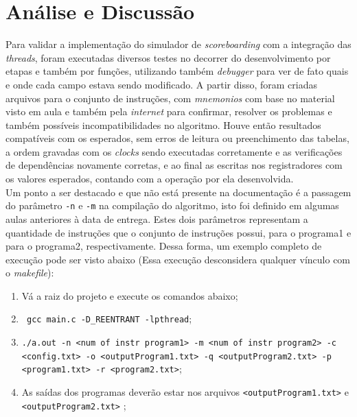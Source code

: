 \documentclass[journal]{IEEEtran}
\begin{document}
\section{Análise e Discussão}

Para validar a implementação do simulador de \textit{scoreboarding} com a integração das \textit{threads}, foram executadas diversos testes no decorrer do desenvolvimento por etapas e também por funções, utilizando também \textit{debugger} para ver de fato quais e onde cada campo estava sendo modificado. A partir disso, foram criadas arquivos para o conjunto de instruções, com \textit{mnemonios} com base no material visto em aula e também pela \textit{internet} para confirmar, resolver os problemas e também possíveis incompatibilidades no algoritmo. Houve então resultados compatíveis com os esperados, sem erros de leitura ou preenchimento das tabelas, a ordem gravadas com os \textit{clocks} sendo executadas corretamente e as verificações de dependências novamente corretas, e ao final as escritas nos registradores com os valores esperados, contando com a operação por ela desenvolvida.\\
Um ponto a ser destacado e que não está presente na documentação é a passagem do parâmetro \texttt{-n} e \texttt{-m} na compilação do algoritmo, isto foi definido em algumas aulas anteriores à data de entrega. Estes dois parâmetros representam a quantidade de instruções que o conjunto de instruções possui, para o programa1 e para o programa2, respectivamente. Dessa forma, um exemplo completo de execução pode ser visto abaixo (Essa execução desconsidera qualquer vínculo com o \textit{makefile}):
\begin{enumerate}
    \item Vá a raiz do projeto e execute os comandos abaixo;
    \item \texttt{ gcc main.c -D\_REENTRANT -lpthread};
    \item \texttt{./a.out -n <num of instr program1> -m <num of instr program2> -c <config.txt> -o <outputProgram1.txt> -q <outputProgram2.txt> -p <program1.txt> -r <program2.txt>};
    \item As saídas dos programas deverão estar nos arquivos \texttt{<outputProgram1.txt>} e \texttt{<outputProgram2.txt>} ;
\end{enumerate}
\end{document}
